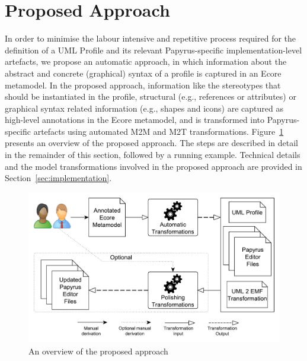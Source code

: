 \section{Proposed Approach}
\label{sec:approach}

In order to minimise the labour intensive and repetitive process required for the definition of a UML Profile and its relevant Papyrus-specific implementation-level artefacts, we propose an automatic approach, in which information about the abstract and concrete (graphical) syntax of a profile is captured in an Ecore metamodel. In the proposed approach, information like the stereotypes that should be instantiated in the profile, structural (e.g., references or attributes) or graphical syntax related information (e.g., shapes and icons) are captured as high-level annotations in the Ecore metamodel, and is transformed into Papyrus-specific artefacts using automated M2M and M2T transformations. Figure~\ref{fig:approachOverview} presents an overview of the proposed approach. The steps are described in detail in the remainder of this section, followed by a running example. Technical details and the model transformations involved in the proposed approach are provided in Section~\ref{sec:implementation}.

\begin{figure}[t]
	\centering
	\includegraphics[width=1\textwidth]{diagrams/approachOverview.pdf}
	\caption[]{An overview of the proposed approach}
	\label{fig:approachOverview}
	\vspace{-6mm}
\end{figure}

